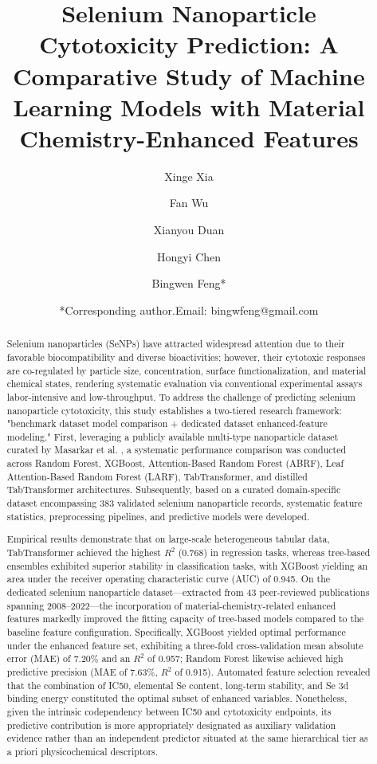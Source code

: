 \documentclass[letterpaper]{article}
\author[1]{Xinge Xia}
\author[1]{Fan Wu}
\affil[1]{College of Cyber Security, Jinan University, Guangzhou, China}
\author[2]{Xianyou Duan}
\affil[2]{College of Chemistry and Materials Science, Jinan University, Guangzhou, China}
\author[1]{Hongyi Chen}
\author[1]{Bingwen Feng*}
\title{Selenium Nanoparticle Cytotoxicity Prediction: A Comparative Study of Machine Learning Models with Material Chemistry-Enhanced Features}
\date{*Corresponding author.Email: bingwfeng@gmail.com}
\begin{document}
\maketitle

\begin{abstract}
  Selenium nanoparticles (SeNPs) have attracted widespread attention due to their favorable biocompatibility and diverse bioactivities; however, their cytotoxic responses are co-regulated by particle size, concentration, surface functionalization, and material chemical states, rendering systematic evaluation via conventional experimental assays labor-intensive and low-throughput. To address the challenge of predicting selenium nanoparticle cytotoxicity, this study establishes a two-tiered research framework: "benchmark dataset model comparison + dedicated dataset enhanced-feature modeling." First, leveraging a publicly available multi-type nanoparticle dataset curated by Masarkar et al. \cite{masarkar2024}, a systematic performance comparison was conducted across Random Forest, XGBoost, Attention-Based Random Forest (ABRF), Leaf Attention-Based Random Forest (LARF), TabTransformer, and distilled TabTransformer architectures. Subsequently, based on a curated domain-specific dataset encompassing 383 validated selenium nanoparticle records, systematic feature statistics, preprocessing pipelines, and predictive models were developed.

Empirical results demonstrate that on large-scale heterogeneous tabular data, TabTransformer achieved the highest $R^2$ (0.768) in regression tasks, whereas tree-based ensembles exhibited superior stability in classification tasks, with XGBoost yielding an area under the receiver operating characteristic curve (AUC) of 0.945. On the dedicated selenium nanoparticle dataset—extracted from 43 peer-reviewed publications spanning 2008--2022—the incorporation of material-chemistry-related enhanced features markedly improved the fitting capacity of tree-based models compared to the baseline feature configuration. Specifically, XGBoost yielded optimal performance under the enhanced feature set, exhibiting a three-fold cross-validation mean absolute error (MAE) of 7.20\% and an $R^2$ of 0.957; Random Forest likewise achieved high predictive precision (MAE of 7.63\%, $R^2$ of 0.915). Automated feature selection revealed that the combination of IC50, elemental Se content, long-term stability, and Se 3d binding energy constituted the optimal subset of enhanced variables. Nonetheless, given the intrinsic codependency between IC50 and cytotoxicity endpoints, its predictive contribution is more appropriately designated as auxiliary validation evidence rather than an independent predictor situated at the same hierarchical tier as a priori physicochemical descriptors.


\end{abstract}
\end{document}
